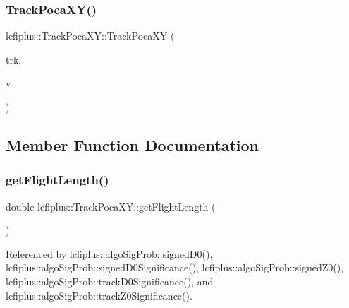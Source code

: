 \mbox{\label{classlcfiplus_1_1TrackPocaXY_ade3f32b6941546906b79b9fe9da00fc6}} 
\subsubsection{Track\+Poca\+X\+Y()\hspace{0.1cm}{\footnotesize\ttfamily [2/2]}}
{\footnotesize\ttfamily lcfiplus\+::\+Track\+Poca\+X\+Y\+::\+Track\+Poca\+XY (\begin{DoxyParamCaption}\item[{const \textbf{ Track} $\ast$}]{trk,  }\item[{const T\+Vector3 \&}]{v }\end{DoxyParamCaption})}



\subsection{Member Function Documentation}
\mbox{\label{classlcfiplus_1_1TrackPocaXY_a7e0bc3eeefad8b904bd62339b1175ca1}} 
\subsubsection{get\+Flight\+Length()}
{\footnotesize\ttfamily double lcfiplus\+::\+Track\+Poca\+X\+Y\+::get\+Flight\+Length (\begin{DoxyParamCaption}{ }\end{DoxyParamCaption})\hspace{0.3cm}{\ttfamily [inline]}}



Referenced by lcfiplus\+::algo\+Sig\+Prob\+::signed\+D0(), lcfiplus\+::algo\+Sig\+Prob\+::signed\+D0\+Significance(), lcfiplus\+::algo\+Sig\+Prob\+::signed\+Z0(), lcfiplus\+::algo\+Sig\+Prob\+::track\+D0\+Significance(), and lcfiplus\+::algo\+Sig\+Prob\+::track\+Z0\+Significance().

\mbox{\label{classlcfiplus_1_1TrackPocaXY_a03f3a611f7424545a31d72c57dc9a71f}} 
